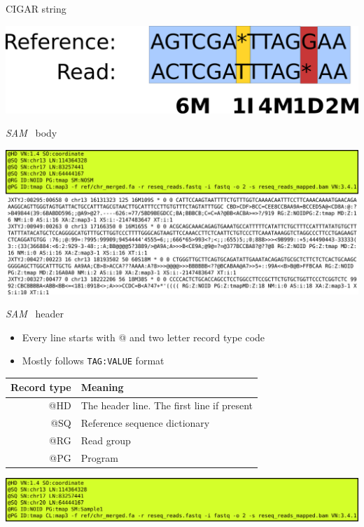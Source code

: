 \documentclass{beamer}
\newcommand{\sam}{\textit{SAM}}
\begin{document}
\begin{frame}{CIGAR string}
  \begin{center}
    \includegraphics[width=\linewidth, keepaspectratio]{pic/c6.png}
  \end{center}
\end{frame}

\begin{frame}{\sam~ body}
  \begin{center}
    \includegraphics[width=\linewidth, keepaspectratio]{pic/sam_full_h.png}
  \end{center}
\end{frame}


\begin{frame}{\sam~ header}
  \begin{itemize}
    \item Every line starts with @ and two letter record type code
    \item Mostly follows \texttt{TAG:VALUE} format
  \end{itemize}

  \begin{tabular}{rl}
    \hline
    Record type & Meaning\\
    \hline
    @HD & The header line. The first line if present \\
    @SQ & Reference sequence dictionary \\
    @RG & Read group\\
    @PG & Program\\
  \end{tabular}
  \begin{center}
    \includegraphics[width=\linewidth, keepaspectratio]{pic/sam_h.png}
  \end{center}
\end{frame}
\end{document}
